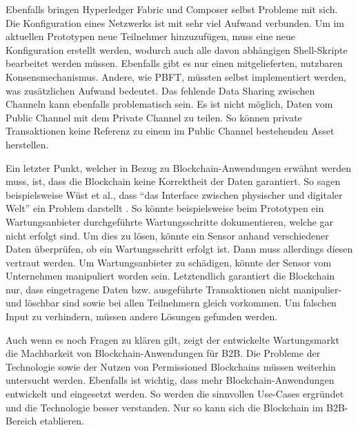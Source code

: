 Ebenfalls bringen Hyperledger Fabric und Composer selbst Probleme mit sich. Die Konfiguration eines Netzwerks ist mit sehr viel Aufwand verbunden. Um im aktuellen Prototypen neue Teilnehmer hinzuzufügen, muss eine neue Konfiguration erstellt werden, wodurch auch alle davon abhängigen Shell-Skripte bearbeitet werden müssen. Ebenfalls gibt es nur einen mitgelieferten, nutzbaren Konsensmechanismus. Andere, wie PBFT, müssten selbst implementiert werden, was zusätzlichen Aufwand bedeutet. Das fehlende Data Sharing zwischen Channeln kann ebenfalls problematisch sein. Es ist nicht möglich, Daten vom Public Channel mit dem Private Channel zu teilen. So können private Transaktionen keine Referenz zu einem im Public Channel bestehenden Asset herstellen.

Ein letzter Punkt, welcher in Bezug zu Blockchain-Anwendungen erwähnt werden muss, ist, dass die Blockchain keine Korrektheit der Daten garantiert. So sagen beispielsweise Wüst et al., dass ``das Interface zwischen physischer und digitaler Welt'' ein Problem darstellt \cite{WustyouneedBlockchain2017}. So könnte beispielsweise beim Prototypen ein Wartungsanbieter durchgeführte Wartungsschritte dokumentieren, welche gar nicht erfolgt sind. Um dies zu lösen, könnte ein Sensor anhand verschiedener Daten überprüfen, ob ein Wartungsschritt erfolgt ist. Dann muss allerdings diesen vertraut werden. Um Wartungsanbieter zu schädigen, könnte der Sensor vom Unternehmen manipuliert worden sein. Letztendlich garantiert die Blockchain nur, dass eingetragene Daten bzw. ausgeführte Transaktionen nicht manipulier- und löschbar sind sowie bei allen Teilnehmern gleich vorkommen. Um falschen Input zu verhindern, müssen andere Lösungen gefunden werden.

Auch wenn es noch Fragen zu klären gilt, zeigt der entwickelte Wartungsmarkt die Machbarkeit von Blockchain-Anwendungen für B2B. Die Probleme der Technologie sowie der Nutzen von Permissioned Blockchains müssen weiterhin untersucht werden. Ebenfalls ist wichtig, dass mehr Blockchain-Anwendungen entwickelt und eingesetzt werden. So werden die sinnvollen Use-Cases ergründet und die Technologie besser verstanden. Nur so kann sich die Blockchain im B2B-Bereich etablieren.


